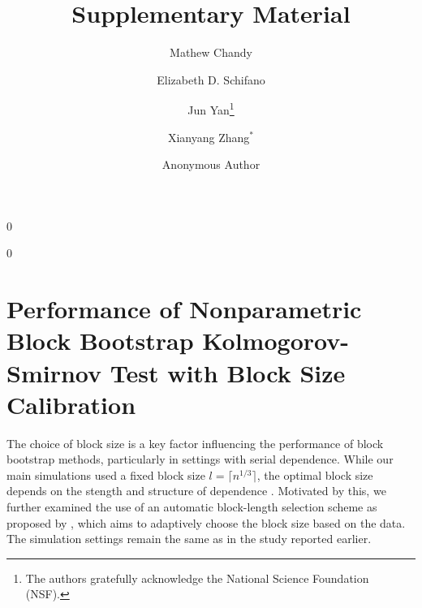 \documentclass[12pt]{article}
\newcommand{\blind}{0}
\begin{document}
%

\def\spacingset#1{\renewcommand{\baselinestretch}%
{#1}\small\normalsize} \spacingset{1}



\title{\bf Supplementary Material}
\blind
{
  \author[1,2]{Mathew Chandy}
  \author[1]{Elizabeth D. Schifano}
  \author[1]{Jun Yan\thanks{
    The authors gratefully acknowledge the National Science Foundation (NSF).}\hspace{.2cm}}
  \author[3]{Xianyang Zhang$^{\ast}$ }
  \maketitle
} \fi

\blind
{
  \bigskip
  \bigskip
  \bigskip
  \author{Anonymous Author}
} \fi

\maketitle

\section{Performance of Nonparametric
Block Bootstrap Kolmogorov-Smirnov Test with Block Size Calibration}

The choice of block size is a key factor influencing the performance
of block bootstrap methods, particularly in settings with serial
dependence. While our main simulations used a fixed block size
$l = \lceil n^{1/3} \rceil$, the optimal block size depends on the
stength and structure of dependence \citep{hall1995blocking,
  buhlmann1999block,  politis2004automatic}. Motivated by this, we
further examined the use of an automatic block-length selection scheme
as proposed by \citet{politis2004automatic}, which aims to adaptively
choose the block size based on the data. The simulation settings
remain the same as in the study reported earlier.
\end{document}
